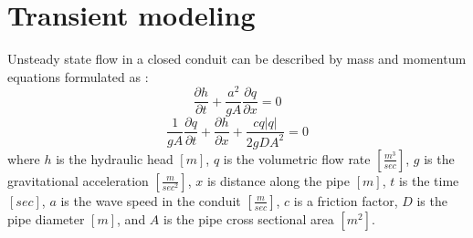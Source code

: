 \documentclass[twocolumn]{autart}
\begin{document}
\section{Transient modeling} \label{app:T}


Unsteady state flow in a closed conduit can be described by mass and momentum equations formulated as \cite{wylie1993}:
\begin{equation}
\frac{\partial h}{\partial t} +  \frac{a^2}{gA}\frac{\partial q}{\partial x} = 0
\end{equation}
\begin{equation}
\frac{1}{gA}\frac{\partial q}{\partial t} + \frac{\partial h}{\partial x} + \frac{cq|q|}{2gDA^2} = 0
\end{equation}
where $h$ is the hydraulic head $[m]$, $q$ is the volumetric flow rate $[\frac{m^3}{sec}]$, $g$ is the gravitational acceleration $[\frac{m}{sec^2}]$, $x$ is distance along the pipe $[m]$, $t$ is the time $[sec]$, $a$ is the wave speed in the conduit $[\frac{m}{sec}]$, $c$ is a friction factor, $D$ is the pipe diameter $[m]$, and $A$ is the pipe cross sectional area $[m^2]$. 
\end{document}
